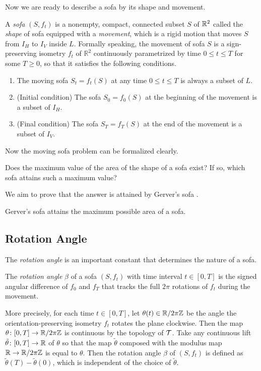 Now we are ready to describe a sofa by its shape and movement.
\begin{definition}
\label{def:sofa}
A \emph{sofa} $(S, f_t)$ is a nonempty, compact, connected subset $S$ of $\mathbb{R}^2$ called the \emph{shape} of sofa equipped with a \emph{movement}, which is a rigid motion that moves $S$ from $I_H$ to $I_V$ inside $L$.
Formally speaking, the movement of sofa $S$ is a sign-preserving isometry $f_t$ of $\mathbb{R}^2$ continuously parametrized by time $0 \leq t \leq T$ for some $T \geq 0$, so that it satisfies the following conditions.
\begin{enumerate}
	\item The moving sofa $S_t = f_t(S)$ at any time $0 \leq t \leq T$ is always a subset of $L$.
	\item (Initial condition) The sofa $S_0 = f_0(S)$ at the beginning of the movement is a subset of $I_H$.
	\item (Final condition) The sofa $S_T = f_T(S)$ at the end of the movement is a subset of $I_V$. 
\end{enumerate}
\end{definition}

Now the moving sofa problem can be formalized clearly.
\begin{problem}
Does the maximum value of the area of the shape of a sofa exist?
If so, which sofa attains such a maximum value?
\end{problem}
We aim to prove that the answer is attained by Gerver's sofa \cite{gerver1992moving}.
\begin{conjecture}
Gerver's sofa \cite{gerver1992moving} attains the maximum possible area of a sofa.
\end{conjecture}

\subsection{Rotation Angle}

The \emph{rotation angle} is an important constant that determines the nature of a sofa.
\begin{definition}
The \emph{rotation angle} $\beta$ of a sofa $(S, f_t)$ with time interval $t \in [0, T]$ is the signed angular difference of $f_0$ and $f_T$ that tracks the full $2\pi$ rotations of $f_t$ during the movement.

More precisely, for each time $t \in [0, T]$, let $\theta(t) \in \mathbb{R} / 2 \pi \mathbb{Z}$ be the angle the orientation-preserving isometry $f_t$ rotates the plane clockwise.
Then the map $\theta \colon [0, T] \rightarrow \mathbb{R} / 2 \pi \mathbb{Z}$ is continuous by the topology of $\mathcal{T}$.
Take any continuous lift $\tilde{\theta} \colon [0, T] \rightarrow \mathbb{R}$ of $\theta$ 
so that the map $\tilde{\theta}$ composed with the modulus map $\mathbb{R} \rightarrow \mathbb{R} / 2 \pi \mathbb{Z}$ is equal to $\theta$.
Then the rotation angle $\beta$ of $(S, f_t)$ is defined as $\tilde{\theta}(T) - \tilde{\theta}(0)$, which is independent of the choice of $\tilde{\theta}$.
\end{definition}

